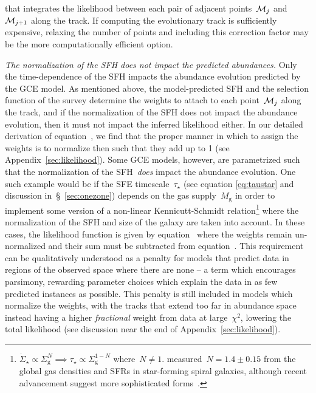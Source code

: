 \documentclass[ms.tex]{subfiles}
\begin{document}
that integrates the likelihood between each pair of adjacent
points~$\mathcal{M}_j$ and~$\mathcal{M}_{j + 1}$ along the track.
If computing the evolutionary track is sufficiently expensive, relaxing the
number of points and including this correction factor may be the more
computationally efficient option.
\par
\textit{The normalization of the SFH does not impact the predicted abundances.}
Only the time-dependence of the SFH impacts the abundance evolution predicted
by the GCE model.
As mentioned above, the model-predicted SFH and the selection function of the
survey determine the weights to attach to each point~$\mathcal{M}_j$ along the
track, and if the normalization of the SFH does not impact the abundance
evolution, then it must not impact the inferred likelihood either.
In our detailed derivation of equation~, we find that the
proper manner in which to assign the weights is to normalize then such that
they add up to 1 (see Appendix~\ref{sec:likelihood}).
Some GCE models, however, are parametrized such that the normalization of the
SFH~\textit{does} impact the abundance evolution.
One such example would be if the SFE timescale~$\tau_\star$ (see equation
\ref{eq:taustar} and discussion in~\S~\ref{sec:onezone}) depends on the gas
supply~$M_\text{g}$ in order to implement some version of a non-linear
Kennicutt-Schmidt relation\footnote{
	$\dot{\Sigma}_\star \propto \Sigma_\text{g}^N \implies \tau_\star \propto
	\Sigma_\text{g}^{1 - N}$ where~$N \neq 1$.
	\citet{Kennicutt1998} measured~$N = 1.4 \pm 0.15$ from the global gas
	densities and SFRs in star-forming spiral galaxies, although recent
	advancement suggest more sophisticated forms~\citep[e.g.,][]{Krumholz2018}.
} where the normalization of the SFH and size of the galaxy are taken into
account.
In these cases, the likelihood function is given by
equation~ where the weights remain un-normalized and
their sum must be subtracted from equation~.
This requirement can be qualitatively understood as a penalty for models that
predict data in regions of the observed space where there are none -- a term
which encourages parsimony, rewarding parameter choices which explain the data
in as few predicted instances as possible.
This penalty is still included in models which normalize the weights, with the
tracks that extend too far in abundance space instead having a higher
\textit{fractional} weight from data at large~$\chi^2$, lowering the total
likelihood (see discussion near the end of Appendix~\ref{sec:likelihood}).
\end{document}
